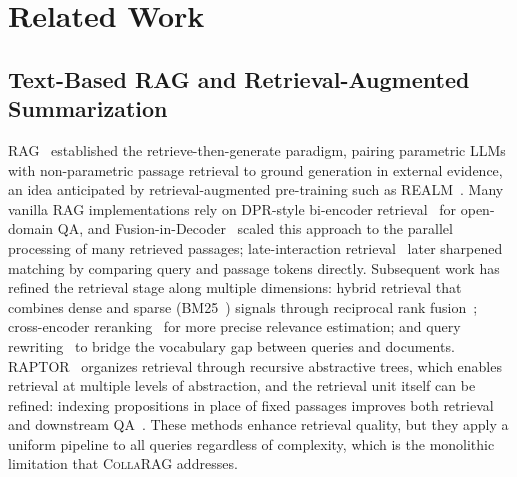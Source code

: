 \documentclass[11pt,a4paper]{article}
\newcommand{\sys}{\textsc{CollaRAG}}
\begin{document}
\section{Related Work}
\label{sec:related}

\subsection{Text-Based RAG and Retrieval-Augmented Summarization}

RAG~\citep{lewis2020rag} established the retrieve-then-generate paradigm, pairing parametric LLMs with non-parametric passage retrieval to ground generation in external evidence, an idea anticipated by retrieval-augmented pre-training such as REALM~\citep{guu2020realm}.
Many vanilla RAG implementations rely on DPR-style bi-encoder retrieval~\citep{karpukhin2020dpr} for open-domain QA, and Fusion-in-Decoder~\citep{izacard2021leveraging} scaled this approach to the parallel processing of many retrieved passages; late-interaction retrieval~\citep{khattab2020colbert} later sharpened matching by comparing query and passage tokens directly.
Subsequent work has refined the retrieval stage along multiple dimensions:
hybrid retrieval that combines dense and sparse (BM25~\citep{robertson2009bm25}) signals through reciprocal rank fusion~\citep{cormack2009reciprocal};
cross-encoder reranking~\citep{nogueira2019passage} for more precise relevance estimation;
and query rewriting~\citep{ma2023query} to bridge the vocabulary gap between queries and documents.
RAPTOR~\citep{sarthi2024raptor} organizes retrieval through recursive abstractive trees, which enables retrieval at multiple levels of abstraction, and the retrieval unit itself can be refined: indexing propositions in place of fixed passages improves both retrieval and downstream QA~\citep{chen2024densex}.
These methods enhance retrieval quality, but they apply a uniform pipeline to all queries regardless of complexity, which is the monolithic limitation that \sys{} addresses.
\end{document}
